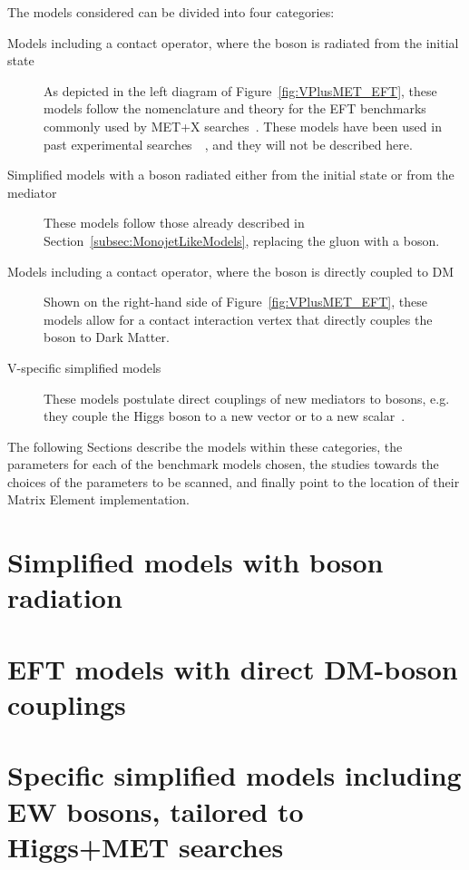 %
The models considered can be divided into four categories:
\begin{description}
 \item[Models including a contact operator, where the boson is radiated from the initial state] As depicted in
 the left diagram of Figure~\ref{fig:VPlusMET_EFT}, these models follow the nomenclature and theory
 for the EFT benchmarks commonly used by MET+X searches~\cite{Goodman:2010ku}. These models
 have been used in past experimental searches~~\cite{Khachatryan:2014rwa, Aad:2014vka,Khachatryan:2014tva, Aad:2014vka,
 ATLAS:2014wra, Aad:2013oja}, and they will not be described here.
 \item[Simplified models with a boson radiated either from the initial state or from the mediator] These models follow those
 already described in Section~\ref{subsec:MonojetLikeModels}, replacing the gluon with a boson.
 \item[Models including a contact operator, where the boson is directly coupled to DM]
 Shown on the right-hand side of Figure~\ref{fig:VPlusMET_EFT},
 these models allow for a contact interaction vertex that directly couples the boson to Dark Matter.
 \item[V-specific simplified models] These models postulate direct couplings of new mediators
 to bosons, e.g. they couple the Higgs boson to a new vector or to a new scalar~\cite{Carpenter:2013xra,Berlin:2014cfa}. 
\end{description}

The following Sections describe the models within these categories,
the parameters for each of the benchmark models chosen,
the studies towards the choices of the parameters to be scanned,
and finally point to the location of their Matrix Element
implementation.

\section{Simplified models with boson radiation}


\section{EFT models with direct DM-boson couplings}


\section{Specific simplified models including EW bosons, tailored to Higgs+MET searches}


